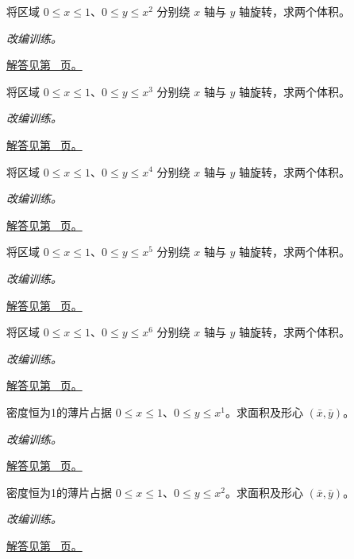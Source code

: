 \documentclass[UTF8,12pt,a4paper,fontset=fandol]{ctexart}
\begin{document}
\begin{example}[同一区域绕不同轴旋转]\label{ex:c21q8}
将区域 $0\le x\le1$、$0\le y\le x^{2}$ 分别绕 $x$ 轴与 $y$ 轴旋转，求两个体积。
\par\textit{改编训练。}\par\hyperref[ans:c21q8]{解答见第~\pageref{ans:c21q8} 页。}
\end{example}
\begin{example}[同一区域绕不同轴旋转]\label{ex:c21q9}
将区域 $0\le x\le1$、$0\le y\le x^{3}$ 分别绕 $x$ 轴与 $y$ 轴旋转，求两个体积。
\par\textit{改编训练。}\par\hyperref[ans:c21q9]{解答见第~\pageref{ans:c21q9} 页。}
\end{example}
\begin{example}[同一区域绕不同轴旋转]\label{ex:c21q10}
将区域 $0\le x\le1$、$0\le y\le x^{4}$ 分别绕 $x$ 轴与 $y$ 轴旋转，求两个体积。
\par\textit{改编训练。}\par\hyperref[ans:c21q10]{解答见第~\pageref{ans:c21q10} 页。}
\end{example}
\begin{example}[同一区域绕不同轴旋转]\label{ex:c21q11}
将区域 $0\le x\le1$、$0\le y\le x^{5}$ 分别绕 $x$ 轴与 $y$ 轴旋转，求两个体积。
\par\textit{改编训练。}\par\hyperref[ans:c21q11]{解答见第~\pageref{ans:c21q11} 页。}
\end{example}
\begin{example}[同一区域绕不同轴旋转]\label{ex:c21q12}
将区域 $0\le x\le1$、$0\le y\le x^{6}$ 分别绕 $x$ 轴与 $y$ 轴旋转，求两个体积。
\par\textit{改编训练。}\par\hyperref[ans:c21q12]{解答见第~\pageref{ans:c21q12} 页。}
\end{example}
\begin{example}[曲边梯形的形心]\label{ex:c21q13}
密度恒为1的薄片占据 $0\le x\le1$、$0\le y\le x^{1}$。求面积及形心 $(\bar x,\bar y)$。
\par\textit{改编训练。}\par\hyperref[ans:c21q13]{解答见第~\pageref{ans:c21q13} 页。}
\end{example}
\begin{example}[曲边梯形的形心]\label{ex:c21q14}
密度恒为1的薄片占据 $0\le x\le1$、$0\le y\le x^{2}$。求面积及形心 $(\bar x,\bar y)$。
\par\textit{改编训练。}\par\hyperref[ans:c21q14]{解答见第~\pageref{ans:c21q14} 页。}
\end{example}
\end{document}
